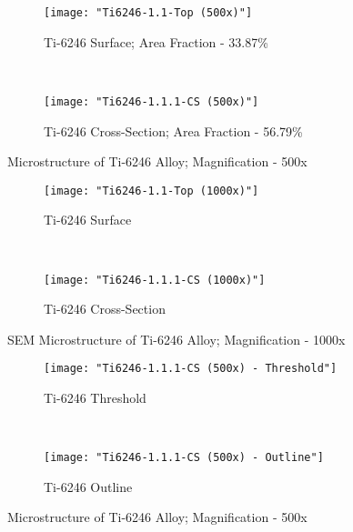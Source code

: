 \begin{figure}[H]
    \centering
    \begin{subfigure}{0.49\textwidth}
        \texttt{[image: "Ti6246-1.1-Top (500x)"]}
        \caption{Ti-6246 Surface; Area Fraction - 33.87\%}
        \label{fig:a-As-Received-micro}
    \end{subfigure}
    ~
    \begin{subfigure}{0.49\textwidth}
        \texttt{[image: "Ti6246-1.1.1-CS (500x)"]}
        \caption{Ti-6246 Cross-Section; Area Fraction - 56.79\%}
        \label{fig:b-As-Received-micro}
    \end{subfigure}
  
    \caption{Microstructure of Ti-6246 Alloy; Magnification - 500x}
    \label{fig:As-Received-micro}
\end{figure}


\begin{figure}[H]
    \centering
    \begin{subfigure}{0.49\textwidth}
        \texttt{[image: "Ti6246-1.1-Top (1000x)"]}
        \caption{Ti-6246 Surface}
        \label{fig:2a}
    \end{subfigure}
    ~
    \begin{subfigure}{0.49\textwidth}
        \texttt{[image: "Ti6246-1.1.1-CS (1000x)"]}
        \caption{Ti-6246 Cross-Section}
        \label{fig:2a}
    \end{subfigure}
  
    \caption{SEM Microstructure of Ti-6246 Alloy; Magnification - 1000x}
    \label{fig:As-Received-SEM}
\end{figure}


\begin{figure}[H]
    \centering
    \begin{subfigure}{0.49\textwidth}
        \texttt{[image: "Ti6246-1.1.1-CS (500x) - Threshold"]}
        \caption{Ti-6246 Threshold}
        \label{fig:Ti-6246 Threshold}
    \end{subfigure}
    ~
    \begin{subfigure}{0.49\textwidth}
        \texttt{[image: "Ti6246-1.1.1-CS (500x) - Outline"]}
        \caption{Ti-6246 Outline}
        \label{fig:Ti-6246 Outline}
    \end{subfigure}
  
    \caption{Microstructure of Ti-6246 Alloy; Magnification - 500x}
    \label{fig:As-Received-SEM}
\end{figure}

